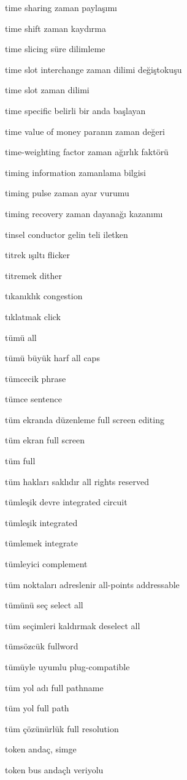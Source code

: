 \documentclass[12pt,fleqn]{article}\usepackage{../../common}
\begin{document}
time sharing zaman paylaşımı

time shift zaman kaydırma

time slicing süre dilimleme

time slot interchange zaman dilimi değiştokuşu

time slot zaman dilimi

time specific belirli bir anda başlayan

time value of money paranın zaman değeri

time-weighting factor zaman ağırlık faktörü

timing information zamanlama bilgisi

timing pulse zaman ayar vurumu

timing recovery zaman dayanağı kazanımı

tinsel conductor gelin teli iletken

titrek ışıltı flicker

titremek dither

tıkanıklık congestion

tıklatmak click

tümü all

tümü büyük harf all caps

tümcecik phrase

tümce sentence

tüm ekranda düzenleme full screen editing

tüm ekran full screen

tüm full

tüm hakları saklıdır all rights reserved

tümleşik devre integrated circuit

tümleşik integrated

tümlemek integrate

tümleyici complement

tüm noktaları adreslenir all-points addressable

tümünü seç select all

tüm seçimleri kaldırmak deselect all

tümsözcük fullword

tümüyle uyumlu plug-compatible

tüm yol adı full pathname

tüm yol full path

tüm çözünürlük full resolution

token andaç, simge

token bus andaçlı veriyolu
\end{document}
